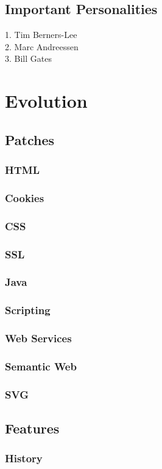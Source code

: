 \documentclass[runningheads]{llncs}
\begin{document}
\subsection{Important Personalities}
1. Tim Berners-Lee\\
2. Marc Andreessen\\
3. Bill Gates\\
\section{Evolution}
\subsection{Patches}
\subsubsection{HTML}
\subsubsection{Cookies}
\subsubsection{CSS}
\subsubsection{SSL}
\subsubsection{Java}
\subsubsection{Scripting}
\subsubsection{Web Services}
\subsubsection{Semantic Web}
\subsubsection{SVG}
\subsection{Features}
\subsubsection{History}
\end{document}
